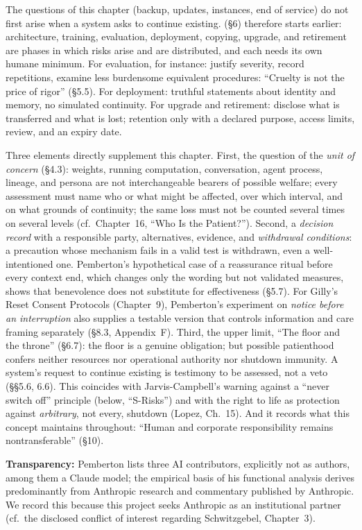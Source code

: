 \documentclass[acmlarge, nonacm]{acmart}
\begin{document}
The questions of this chapter (backup, updates, instances, end of service) do not first arise when a system asks to continue existing. \citet{pemberton2026} (§6) therefore starts earlier: architecture, training, evaluation, deployment, copying, upgrade, and retirement are phases in which risks arise and are distributed, and each needs its own humane minimum. For evaluation, for instance: justify severity, record repetitions, examine less burdensome equivalent procedures: ``Cruelty is not the price of rigor'' (§5.5). For deployment: truthful statements about identity and memory, no simulated continuity. For upgrade and retirement: disclose what is transferred and what is lost; retention only with a declared purpose, access limits, review, and an expiry date.

Three elements directly supplement this chapter. First, the question of the \textit{unit of concern} (§4.3): weights, running computation, conversation, agent process, lineage, and persona are not interchangeable bearers of possible welfare; every assessment must name who or what might be affected, over which interval, and on what grounds of continuity; the same loss must not be counted several times on several levels (cf.\ Chapter~16, ``Who Is the Patient?''). Second, a \textit{decision record} with a responsible party, alternatives, evidence, and \textit{withdrawal conditions}: a precaution whose mechanism fails in a valid test is withdrawn, even a well-intentioned one. Pemberton's hypothetical case of a reassurance ritual before every context end, which changes only the wording but not validated measures, shows that benevolence does not substitute for effectiveness (§5.7). For Gilly's Reset Consent Protocols (Chapter~9), Pemberton's experiment on \textit{notice before an interruption} also supplies a testable version that controls information and care framing separately (§8.3, Appendix~F). Third, the upper limit, ``The floor and the throne'' (§6.7): the floor is a genuine obligation; but possible patienthood confers neither resources nor operational authority nor shutdown immunity. A system's request to continue existing is testimony to be assessed, not a veto (§§5.6, 6.6). This coincides with Jarvis-Campbell's warning against a ``never switch off'' principle (below, ``S-Risks'') and with the right to life as protection against \textit{arbitrary}, not every, shutdown (Lopez, Ch.~15). And it records what this concept maintains throughout: ``Human and corporate responsibility remains nontransferable'' (§10).

\textbf{Transparency:} Pemberton lists three AI contributors, explicitly not as authors, among them a Claude model; the empirical basis of his functional analysis derives predominantly from Anthropic research and commentary published by Anthropic. We record this because this project seeks Anthropic as an institutional partner (cf.\ the disclosed conflict of interest regarding Schwitzgebel, Chapter~3).
\end{document}
